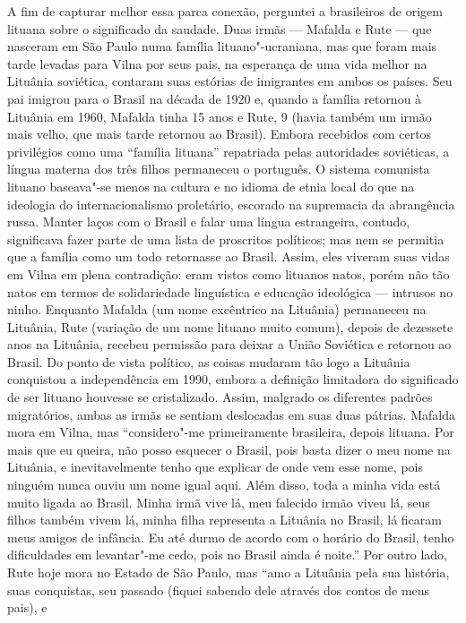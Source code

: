 A fim de capturar melhor essa parca conexão, perguntei a brasileiros de
origem lituana sobre o significado da saudade. Duas irmãs --- Mafalda e
Rute --- que nasceram em São Paulo numa família lituano"-ucraniana, mas que
foram mais tarde levadas para Vilna por seus pais, na esperança de uma
vida melhor na Lituânia soviética, contaram suas estórias de imigrantes
em ambos os países. Seu pai imigrou para o Brasil na década de 1920 e,
quando a família retornou à Lituânia em 1960, Mafalda tinha 15 anos e
Rute, 9 (havia também um irmão mais velho, que mais tarde retornou ao
Brasil). Embora recebidos com certos privilégios como uma ``família
lituana'' repatriada pelas autoridades soviéticas, a língua materna dos
três filhos permaneceu o português. O sistema comunista lituano
baseava"-se menos na cultura e no idioma de etnia local do que na
ideologia do internacionalismo proletário, escorado na supremacia da
abrangência russa. Manter laços com o Brasil e falar uma língua
estrangeira, contudo, significava fazer parte de uma lista de proscritos
políticos; mas nem se permitia que a família como um todo retornasse ao
Brasil. Assim, eles viveram suas vidas em Vilna em plena contradição:
eram vistos como lituanos natos, porém não tão natos em termos de
solidariedade linguística e educação ideológica --- intrusos no ninho.
Enquanto Mafalda (um nome excêntrico na Lituânia) permaneceu na
Lituânia, Rute (variação de um nome lituano muito comum), depois de
dezessete anos na Lituânia, recebeu permissão para deixar a União
Soviética e retornou ao Brasil. Do ponto de vista político, as coisas
mudaram tão logo a Lituânia conquistou a independência em 1990, embora a
definição limitadora do significado de ser lituano houvesse se
cristalizado. Assim, malgrado os diferentes padrões migratórios, ambas
as irmãs se sentiam deslocadas em suas duas pátrias. Mafalda mora em
Vilna, mas ``considero"-me primeiramente brasileira, depois lituana. Por
mais que eu queira, não posso esquecer o Brasil, pois basta dizer o meu
nome na Lituânia, e inevitavelmente tenho que explicar de onde vem esse
nome, pois ninguém nunca ouviu um nome igual aqui. Além disso, toda a
minha vida está muito ligada ao Brasil. Minha irmã vive lá, meu falecido
irmão viveu lá, seus filhos também vivem lá, minha filha representa a
Lituânia no Brasil, lá ficaram meus amigos de infância. Eu até durmo de
acordo com o horário do Brasil, tenho dificuldades em levantar"-me cedo,
pois no Brasil ainda é noite.'' Por outro lado, Rute hoje mora no Estado
de São Paulo, mas ``amo a Lituânia pela sua história, suas conquistas,
seu passado (fiquei sabendo dele através dos contos de meus pais), e
